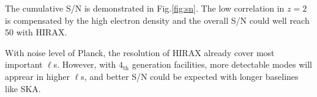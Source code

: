 The cumulative S/N is demonstrated in Fig.\ref{fig:sn}. 
The low correlation in $z=2$ is compensated by the high electron density 
and the overall S/N could well reach 50 with HIRAX.

With noise level of Planck, 
the resolution of HIRAX already cover most important $\ell$s. 
However, with $4_\mathrm{th}$ generation facilities, 
more detectable modes will apprear in higher $\ell$s, 
and better S/N could be expected with longer baselines like SKA.

